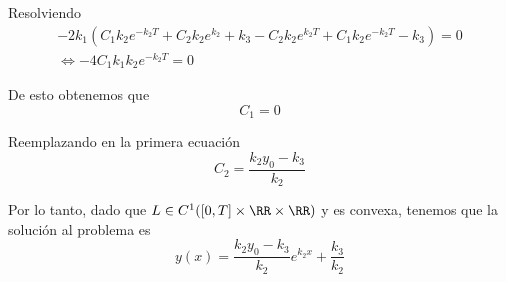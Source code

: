 \documentclass[a4paper,oneside,10.5pt]{USMArt}
\begin{document}
\begin{sol}
\begin{enumerate}
        Resolviendo
        \begin{gather*}
          -2k_{1}(C_{1}k_{2}e^{-k_{2}T} + C_{2}k_{2}e^{k_{2}} + k_{3} - C_{2}k_{2}e^{k_{2}T} + C_{1}k_{2}e^{-k_{2}T} - k_{3}) = 0\\
          \iff -4C_{1}k_{1}k_{2}e^{-k_{2}T} = 0
        \end{gather*}

        De esto obtenemos que
        \begin{equation*}
          C_{1} = 0
        \end{equation*}

        Reemplazando en la primera ecuación
        \begin{equation*}
          C_{2} = \frac{k_{2}y_{0} - k_{3}}{k_{2}}
        \end{equation*}

        Por lo tanto, dado que $L \in C^{1}([0, T] \times \RR \times \RR)$ y es convexa, tenemos que la solución
        al problema es
        \begin{equation*}
          y(x) = \frac{k_{2}y_{0} - k_{3}}{k_{2}}e^{k_{2}x} + \frac{k_{3}}{k_{2}}
        \end{equation*}

\end{enumerate}
\end{sol}
\end{document}
